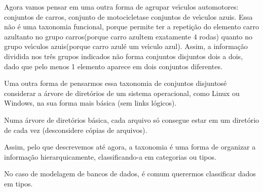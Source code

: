 \documentclass[
12pt,		%
openright,	%
twoside,  %
a4paper,			%
chapter=TITLE,		%
english,			%
french,				%
spanish,			%
brazil				%
]{USPSC-classe/USPSC}
\begin{document}
Agora vamos pensar em uma outra forma de agrupar ve\'{\i}culos automotores: conjuntos de \textquotedbl carros\textquotedbl , conjunto de \textquotedbl motocicletas\textquotedbl  e conjuntos de \textquotedbl ve\'{\i}culos azuis\textquotedbl . Essa n\~ao \'e uma taxonomia funcional, porque permite ter a repeti\c{c}\~ao do elemento \textquotedbl carro azul\textquotedbl  tanto no grupo \textquotedbl carros\textquotedbl  (porque \textquotedbl carro azul\textquotedbl  tem exatamente 4 rodas) quanto no grupo \textquotedbl ve\'{\i}culos azuis\textquotedbl  (porque \textquotedbl carro azul\textquotedbl  \'e um \textquotedbl ve\'{\i}culo azul\textquotedbl ). Assim, a informa\c{c}\~ao dividida nos tr\^es grupos indicados n\~ao forma conjuntos disjuntos dois a dois, dado que pelo menos 1 elemento aparece em dois conjuntos diferentes.














Uma outra forma de pensarmos essa \textquotedbl taxonomia de conjuntos disjuntos\textquotedbl  \'e considerar a \'arvore de diret\'orios de um sistema operacional, como Linux ou Windows, na sua forma mais b\'asica (sem links l\'ogicos).














Numa \'arvore de diret\'orios b\'asica, cada arquivo s\'o consegue estar em um diret\'orio de cada vez (desconsidere c\'opias de arquivos).














Assim, pelo que descrevemos at\'e agora, a taxonomia \'e uma forma de organizar a informa\c{c}\~ao hierarquicamente, classificando-a em categorias ou tipos.














No caso de modelagem de bancos de dados, \'e comum querermos classificar dados em tipos.
\end{document}
